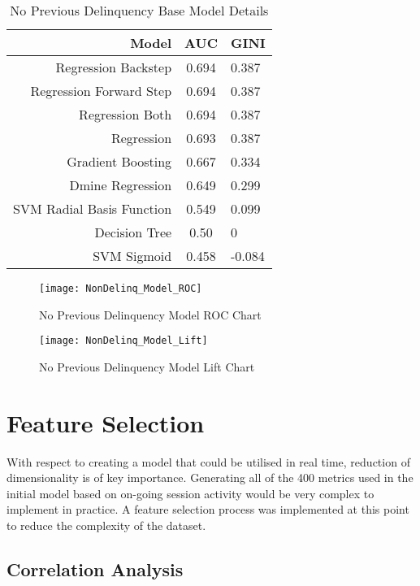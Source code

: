 \begin{table}[H]
	\centering
	\begin{tabular}{r | c | l}
		\hline
		\textbf{Model} & \textbf{AUC} & \textbf{GINI} \\
		\hline
		Regression Backstep          & 0.694        & 0.387 \\
		Regression Forward Step          & 0.694        & 0.387 \\
		\hline
		Regression Both          & 0.694        & 0.387 \\
				\hline
		Regression          & 0.693        & 0.387 \\
				\hline
		Gradient Boosting          & 0.667        & 0.334 \\
		Dmine Regression          & 0.649        & 0.299 \\
		SVM Radial Basis Function          & 0.549        & 0.099 \\
		Decision Tree          & 0.50        & 0 \\
		SVM Sigmoid         & 0.458        & -0.084 \\
		\hline
	\end{tabular}
	\caption{No Previous Delinquency Base Model Details}
\end{table}

\begin{figure}[H]
	\texttt{[image: NonDelinq\_Model\_ROC]}
	\caption{No Previous Delinquency Model ROC Chart}
	\label{fig:NonDelinq_Model_ROC}
\end{figure}

\begin{figure}[H]
	\texttt{[image: NonDelinq\_Model\_Lift]}
	\caption{No Previous Delinquency Model Lift Chart}
	\label{fig:NonDelinq_Model_Lift}
\end{figure}

\section{Feature Selection}
With respect to creating a model that could be utilised in real time, reduction of dimensionality is of key importance. Generating all of the 400 metrics used in the initial model based on on-going session activity would be very complex to implement in practice. A feature selection process was implemented at this point to reduce the complexity of the dataset. 

\subsection{Correlation Analysis}

